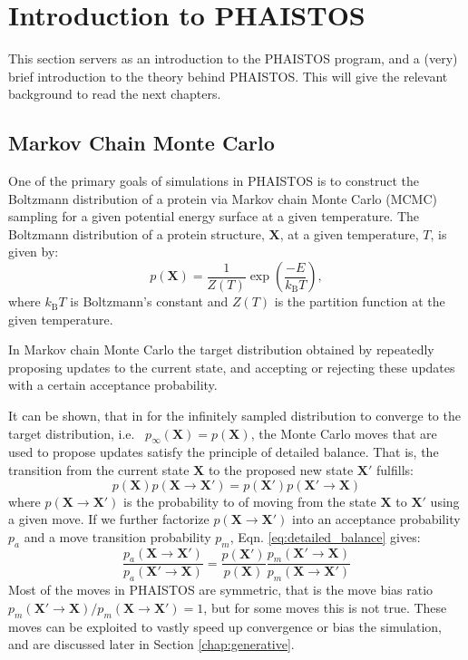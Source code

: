 \chapter{Introduction to PHAISTOS}

This section servers as an introduction to the PHAISTOS program, and a (very) brief introduction to the theory behind PHAISTOS.
This will give the relevant background to read the next chapters.

\section{Markov Chain Monte Carlo}

One of the primary goals of simulations in PHAISTOS is to construct the Boltzmann distribution of a protein via Markov chain Monte Carlo (MCMC) sampling for a given potential energy surface at a given temperature.
The Boltzmann distribution of a protein structure, $\mathbf X$, at a given temperature, $T$, is given by:
\begin{equation}
    \label{eq:boltzmann}
    p(\mathbf X) = \frac{1}{Z(T)} \exp{\left( \frac{-E}{k_\mathrm{B}T}\right)},
\end{equation}
where $k_\mathrm{B}T$ is Boltzmann's constant and $Z(T)$ is the partition function at the given temperature.

In Markov chain Monte Carlo the target distribution obtained by repeatedly proposing updates to the current state, and accepting or rejecting these updates with a certain acceptance probability.

It can be shown, that in for the infinitely sampled distribution  to converge to the target distribution, i.e.~ $p_\infty(\mathbf X) = p(\mathbf X)$, the Monte Carlo moves that are used to propose updates satisfy the principle of detailed balance.
That is, the transition from the current state $\mathbf{X}$ to the proposed new state $\mathbf{X'}$ fulfills:
\begin{equation}
    \label{eq:detailed_balance}
    p(\mathbf{X}) p(\mathbf{X} \rightarrow \mathbf{X'}) = 
    p(\mathbf{X'}) p(\mathbf{X'} \rightarrow \mathbf{X})
\end{equation}
where $p(\mathbf{X} \rightarrow \mathbf{X'})$ is the probability to of moving from the state $\mathbf{X}$ to $\mathbf{X'}$ using a given move.
If we further factorize $p(\mathbf{X} \rightarrow \mathbf{X'})$ into an acceptance probability $p_a$ and a move transition probability $p_m$, Eqn. \ref{eq:detailed_balance} gives:
\begin{equation}
    \label{eq:unbiased_mc}
    \frac{p_a(\mathbf{X} \rightarrow \mathbf{X'})}
         {p_a(\mathbf{X'} \rightarrow \mathbf{X})} =
    \frac{p(\mathbf{X'})}
         {p(\mathbf{X})}
    \frac{p_m(\mathbf{X'} \rightarrow \mathbf{X})}
         {p_m(\mathbf{X} \rightarrow \mathbf{X'})}
\end{equation}
Most of the moves in PHAISTOS are symmetric, that is the move bias ratio $p_m(\mathbf{X'} \rightarrow \mathbf{X}) / p_m(\mathbf{X} \rightarrow \mathbf{X'}) = 1$, but for some moves this is not true. 
These moves can be exploited to vastly speed up convergence or bias the simulation, and are discussed later in Section \ref{chap:generative}.

